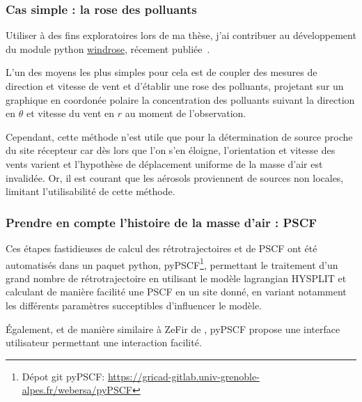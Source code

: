 \subsubsection{Cas simple : la rose des polluants}%
\label{ssub:cas_simple_la_rose_des_polluants}

\begin{tcolorbox}[colback=red!5!white,colframe=Melon,title=Note]
    Utiliser à des fins exploratoires lors de ma thèse, j'ai contribuer au développement
    du module python \href{https://github.com/python-windrose/windrose/}{windrose},
    récement publiée~\autocite{scls19frPythonwindrose2019}.
\end{tcolorbox}

L'un des moyens les plus simples pour cela est de coupler des mesures de direction et
vitesse de vent et d'établir une rose des polluants, projetant sur un graphique en
coordonée polaire la concentration des polluants suivant la direction en $\theta$ et
vitesse du vent en $r$ au moment de l'observation.

Cependant, cette méthode n'est utile que pour la détermination de source proche du site
récepteur car dès lors que l'on s'en éloigne, l'orientation et vitesse des vents varient
et l'hypothèse de déplacement uniforme de la masse d'air est invalidée.  Or, il est
courant que les aérosols proviennent de sources non locales, limitant l'utilisabilité de
cette méthode.


\subsubsection{Prendre en compte l'histoire de la masse d'air : PSCF}%
\label{sub:prendre_en_compte_l_histoire_de_la_masse_d_air_PSCF}

\begin{tcolorbox}[colback=red!5!white,colframe=Melon,title=Note]
    Ces étapes fastidieuses de calcul des rétrotrajectoires et de PSCF ont été automatisés
    dans un paquet python, pyPSCF\footnote{Dépot git pyPSCF:
    \url{https://gricad-gitlab.univ-grenoble-alpes.fr/webersa/pyPSCF}}, permettant le
    traitement d'un grand nombre de rétrotrajectoire en utilisant le modèle lagrangian
    HYSPLIT et calculant de manière facilité une PSCF en un site donné, en variant
    notamment les différents paramètres succeptibles d'influencer le modèle.

    Également, et de manière similaire à ZeFir de \textcite{petitUserfriendly2017}, pyPSCF
    propose une interface utilisateur permettant une interaction facilité.
\end{tcolorbox}

